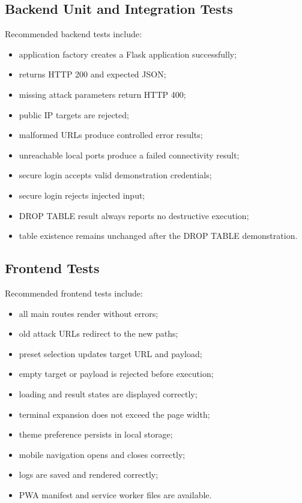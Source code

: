 \documentclass[12pt,a4paper]{article}
\newcommand{\code}[1]{\texttt{\detokenize{#1}}}
\begin{document}
\subsection{Backend Unit and Integration Tests}

Recommended backend tests include:

\begin{itemize}[leftmargin=1.4cm]
    \item application factory creates a Flask application successfully;
    \item \code{/api/health} returns HTTP 200 and expected JSON;
    \item missing attack parameters return HTTP 400;
    \item public IP targets are rejected;
    \item malformed URLs produce controlled error results;
    \item unreachable local ports produce a failed connectivity result;
    \item secure login accepts valid demonstration credentials;
    \item secure login rejects injected input;
    \item DROP TABLE result always reports no destructive execution;
    \item table existence remains unchanged after the DROP TABLE demonstration.
\end{itemize}

\subsection{Frontend Tests}

Recommended frontend tests include:

\begin{itemize}[leftmargin=1.4cm]
    \item all main routes render without errors;
    \item old attack URLs redirect to the new \code{/attacks/...} paths;
    \item preset selection updates target URL and payload;
    \item empty target or payload is rejected before execution;
    \item loading and result states are displayed correctly;
    \item terminal expansion does not exceed the page width;
    \item theme preference persists in local storage;
    \item mobile navigation opens and closes correctly;
    \item logs are saved and rendered correctly;
    \item PWA manifest and service worker files are available.
\end{itemize}
\end{document}
